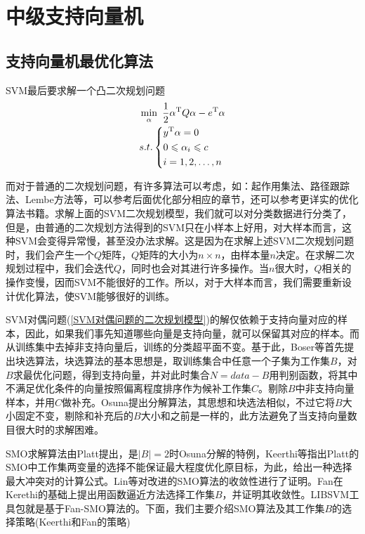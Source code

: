 % 
\chapter{中级支持向量机}
\section{支持向量机最优化算法}
    \par
    SVM最后要求解一个凸二次规划问题
    \begin{align}
    \label{SVM对偶问题的二次规划模型}
    & \min _\alpha \ \frac{1}{2}\alpha^\mathrm{T}Q\alpha - e^\mathrm{T}\alpha\\
    & s.t.\left\{
    \begin{aligned}
    & y^\mathrm{T} \alpha  = 0\\
    & 0 \leqslant \alpha_i \leqslant c\\
    & i=1,2,\dots,n
    \end{aligned}
    \right.\notag
    \end{align}
    \par
    而对于普通的二次规划问题，有许多算法可以考虑，如：起作用集法、路径跟踪法、Lembe方法等，可以参考后面优化部分相应的章节，还可以参考更详实的优化算法书籍。求解上面的SVM二次规划模型，我们就可以对分类数据进行分类了，但是，由普通的二次规划方法得到的SVM只在小样本上好用，对大样本而言，这种SVM会变得异常慢，甚至没办法求解。这是因为在求解上述SVM二次规划问题时，我们会产生一个$Q$矩阵，$Q$矩阵的大小为$n\times n$，由样本量$n$决定。在求解二次规划过程中，我们会迭代$Q$，同时也会对其进行许多操作。当$n$很大时，$Q$相关的操作变慢，因而SVM不能很好的工作。所以，对于大样本而言，我们需要重新设计优化算法，使SVM能够很好的训练。
    \par
    SVM对偶问题(\ref{SVM对偶问题的二次规划模型})的解仅依赖于支持向量对应的样本，因此，如果我们事先知道哪些向量是支持向量，就可以保留其对应的样本。而从训练集中去掉非支持向量后，训练的分类超平面不变。基于此，Boser等首先提出块选算法，块选算法的基本思想是，取训练集合中任意一个子集为工作集$B$，对$B$求最优化问题，得到支持向量，并对此时集合$N = data - B$用判别函数，将其中不满足优化条件的向量按照偏离程度排序作为候补工作集$C$。剔除$B$中非支持向量样本，并用$C$做补充。Osuna提出分解算法，其思想和块选法相似，不过它将$B$大小固定不变，剔除和补充后的$B$大小和之前是一样的，此方法避免了当支持向量数目很大时的求解困难。
    \par
    SMO求解算法由Platt提出，是$|B| = 2$时Osuna分解的特例，Keerthi等指出Platt的SMO中工作集两变量的选择不能保证最大程度优化原目标，为此，给出一种选择最大冲突对的计算公式。Lin等对改进的SMO算法的收敛性进行了证明。Fan在Kerethi的基础上提出用函数逼近方法选择工作集$B$，并证明其收敛性。LIBSVM工具包就是基于Fan-SMO算法的。下面，我们主要介绍SMO算法及其工作集$B$的选择策略(Keerthi和Fan的策略)
